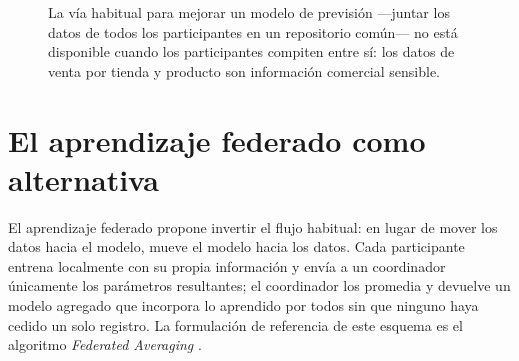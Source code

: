 \begin{figure}[H]
  \centering
  \caption[El obstáculo a la centralización de datos entre operadores]{La vía habitual para
  mejorar un modelo de previsión —juntar los datos de todos los participantes en un repositorio
  común— no está disponible cuando los participantes compiten entre sí: los datos de venta por
  tienda y producto son información comercial sensible.}
  \label{fig:problema_centralizacion}
\end{figure}

\section{El aprendizaje federado como alternativa}

El aprendizaje federado propone invertir el flujo habitual: en lugar de mover los datos hacia el
modelo, mueve el modelo hacia los datos. Cada participante entrena localmente con su propia
información y envía a un coordinador únicamente los parámetros resultantes; el coordinador los
promedia y devuelve un modelo agregado que incorpora lo aprendido por todos sin que ninguno haya
cedido un solo registro. La formulación de referencia de este esquema es el algoritmo
\emph{Federated Averaging} \parencite{mcmahan2017}.

